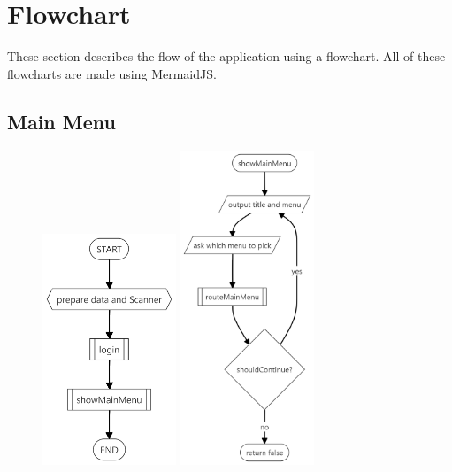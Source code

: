 \documentclass[12pt,titlepage]{article}
\begin{document}
\pagebreak

\section{Flowchart}
These section describes the flow of the application using a flowchart. All of these flowcharts are made using
MermaidJS.

\subsection{Main Menu}

\begin{figure}[h]
    \begin{minipage}{.45\textwidth}
        \centering
        \includegraphics[width=4cm]{flowcharts/main.png}
    \end{minipage}
    \begin{minipage}{.5\textwidth}
        \centering
        \includegraphics[width=4cm]{flowcharts/main-menu.png}
    \end{minipage}
\end{figure}
\end{document}
